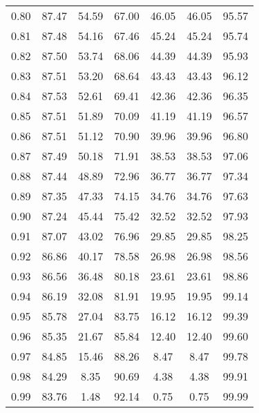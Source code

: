 \begin{tabular}{|c|c|c|c|c|c|c|}
      0.80 &     87.47 &     54.59 &      67.00 &   46.05 &      46.05 &         95.57 \\
      0.81 &     87.48 &     54.16 &      67.46 &   45.24 &      45.24 &         95.74 \\
      0.82 &     87.50 &     53.74 &      68.06 &   44.39 &      44.39 &         95.93 \\
      0.83 &     87.51 &     53.20 &      68.64 &   43.43 &      43.43 &         96.12 \\
      0.84 &     87.53 &     52.61 &      69.41 &   42.36 &      42.36 &         96.35 \\
      0.85 &     87.51 &     51.89 &      70.09 &   41.19 &      41.19 &         96.57 \\
      0.86 &     87.51 &     51.12 &      70.90 &   39.96 &      39.96 &         96.80 \\
      0.87 &     87.49 &     50.18 &      71.91 &   38.53 &      38.53 &         97.06 \\
      0.88 &     87.44 &     48.89 &      72.96 &   36.77 &      36.77 &         97.34 \\
      0.89 &     87.35 &     47.33 &      74.15 &   34.76 &      34.76 &         97.63 \\
      0.90 &     87.24 &     45.44 &      75.42 &   32.52 &      32.52 &         97.93 \\
      0.91 &     87.07 &     43.02 &      76.96 &   29.85 &      29.85 &         98.25 \\
      0.92 &     86.86 &     40.17 &      78.58 &   26.98 &      26.98 &         98.56 \\
      0.93 &     86.56 &     36.48 &      80.18 &   23.61 &      23.61 &         98.86 \\
      0.94 &     86.19 &     32.08 &      81.91 &   19.95 &      19.95 &         99.14 \\
      0.95 &     85.78 &     27.04 &      83.75 &   16.12 &      16.12 &         99.39 \\
      0.96 &     85.35 &     21.67 &      85.84 &   12.40 &      12.40 &         99.60 \\
      0.97 &     84.85 &     15.46 &      88.26 &    8.47 &       8.47 &         99.78 \\
      0.98 &     84.29 &      8.35 &      90.69 &    4.38 &       4.38 &         99.91 \\
      0.99 &     83.76 &      1.48 &      92.14 &    0.75 &       0.75 &         99.99 \\
\bottomrule
\end{tabular}
